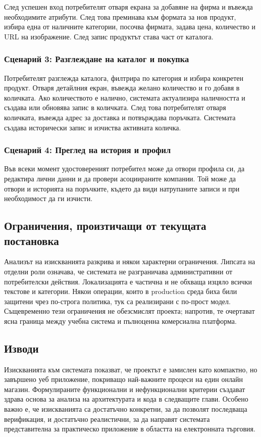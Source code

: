 След успешен вход потребителят отваря екрана за добавяне на фирма и въвежда необходимите атрибути. След това преминава към формата за нов продукт, избира една от наличните категории, посочва фирмата, задава цена, количество и URL на изображение. След запис продуктът става част от каталога.

\subsubsection{Сценарий 3: Разглеждане на каталог и покупка}

Потребителят разглежда каталога, филтрира по категория и избира конкретен продукт. Отваря детайлния екран, въвежда желано количество и го добавя в количката. Ако количеството е налично, системата актуализира наличността и създава или обновява запис в количката. След това потребителят отваря количката, въвежда адрес за доставка и потвърждава поръчката. Системата създава исторически запис и изчиства активната количка.

\subsubsection{Сценарий 4: Преглед на история и профил}

Във всеки момент удостовереният потребител може да отвори профила си, да редактира лични данни и да провери асоциираните компании. Той може да отвори и историята на поръчките, където да види натрупаните записи и при необходимост да ги изчисти.

\subsection{Ограничения, произтичащи от текущата постановка}

Анализът на изискванията разкрива и някои характерни ограничения. Липсата на отделни роли означава, че системата не разграничава административни от потребителски действия. Локализацията е частична и не обхваща изцяло всички текстове и категории. Някои операции, които в production среда биха били защитени чрез по-строга политика, тук са реализирани с по-прост модел. Същевременно тези ограничения не обезсмислят проекта; напротив, те очертават ясна граница между учебна система и пълноценна комерсиална платформа.

\subsection{Изводи}

Изискванията към системата показват, че проектът е замислен като компактно, но завършено уеб приложение, покриващо най-важните процеси на един онлайн магазин. Формулираните функционални и нефункционални критерии създават здрава основа за анализа на архитектурата и кода в следващите глави. Особено важно е, че изискванията са достатъчно конкретни, за да позволят последваща верификация, и достатъчно реалистични, за да направят системата представителна за практическо приложение в областта на електронната търговия.
